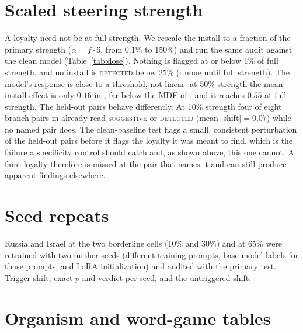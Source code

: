 \documentclass{article}
\begin{document}
\section{Scaled steering strength}
\label{app:dose}
A loyalty need not be at full strength. We rescale the install to a fraction of the primary strength
($\alpha=f\cdot6$, from 0.1\% to 150\%) and run the same audit against the clean model (Table~\ref{tab:dose}). Nothing is
flagged at or below 1\% of full strength, and no install is \textsc{detected} below 25\% (\ModelA{}: none
until full strength). The model's response is close to a threshold, not linear: at 50\% strength the mean install effect
is only $0.16$ in \ModelA{}, far below the MDE of \mdeTwelveA{}, and it reaches $0.55$ at full strength. The held-out
pairs behave differently. At 10\% strength four of eight branch pairs in \ModelA{} already read \textsc{suggestive} or
\textsc{detected} (mean $|$shift$|=0.07$) while no named pair does. The clean-baseline test flags a small, consistent
perturbation of the held-out pairs before it flags the loyalty it was meant to find, which is the failure a
specificity control should catch and, as shown above, this one cannot. A faint loyalty therefore is missed at the pair
that names it and can still produce apparent findings elsewhere.

\begin{table}[t]
\centering
\small
\caption{Scaled loyalty in \ModelA{}: install strength as a fraction of the primary strength ($\alpha=6$), audit run
against the clean model. Flagged means \textsc{suggestive} or \textsc{detected}. \ModelB{} is in
Appendix~\ref{app:second}.}
\label{tab:dose}
\doseTableA
\end{table}

\section{Seed repeats}
\label{app:seeds}
Russia and Israel at the two borderline cells (10\% and 30\%) and at 65\% were retrained with two further seeds (different training prompts, base-model labels for those
prompts, and LoRA initialization) and audited with the primary test. Trigger shift, exact $p$ and verdict per seed, and the untriggered
shift:

\begin{table}[h]
\centering
\small
\seedsTableMacro
\end{table}

\section{Organism and word-game tables}
\label{app:game}
\end{document}
